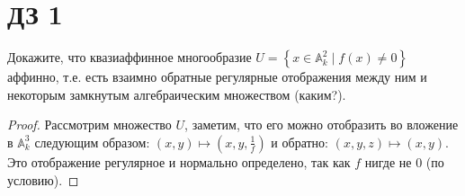 \section{ДЗ 1}

\begin{prob}
Докажите, что квазиаффинное многообразие $U=\left\{x \in \mathbb{A}_k^2 \mid f(x) \neq 0\right\}$ аффинно, т.е. есть взаимно обратные регулярные отображения между ним и некоторым замкнутым алгебраическим множеством (каким?).
\end{prob}

\begin{proof}
Рассмотрим множество $U$, заметим, что его можно отобразить во вложение в $\mathbb{A}_k^3$ следующим образом: $(x,y) \mapsto \left(x, y, \frac{1}{f}\right)$ и обратно: $(x,y,z) \mapsto (x,y)$. Это отображение регулярное и нормально определено, так как $f$ нигде не $0$ (по условию).
\end{proof}

